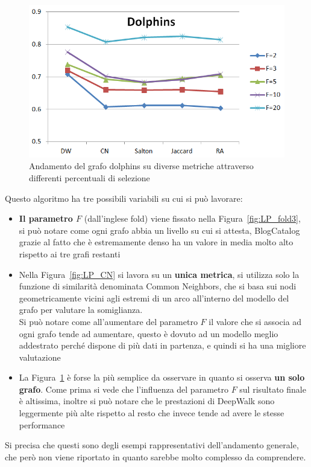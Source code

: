 %
\begin{figure}[htp]
	\centering
	\includegraphics[width=\linewidth]{immagini/LP_Dolphins}
	\caption{Andamento del grafo dolphins su diverse metriche attraverso differenti percentuali di selezione}
	\label{fig:LP_Dolphins}
\end{figure}
%
Questo algoritmo ha tre possibili variabili su cui si può lavorare:
\begin{itemize}
	\item \textbf{Il parametro $F$} (dall'inglese fold) viene fissato nella Figura~\ref{fig:LP_fold3}, si può notare come ogni grafo abbia un livello su cui si attesta, BlogCatalog grazie al fatto che è estremamente denso ha un valore in media molto alto rispetto ai tre grafi restanti
	\item Nella Figura~\ref{fig:LP_CN} si lavora su un \textbf{unica metrica}, si utilizza solo la funzione di similarità denominata Common Neighbors, che si basa sui nodi geometricamente vicini agli estremi di un arco all'interno del modello del grafo per valutare la somiglianza.\\
	Si può notare come all'aumentare del parametro $F$ il valore che si associa ad ogni grafo tende ad aumentare, questo è dovuto ad un modello meglio addestrato perché dispone di più dati in partenza, e quindi si ha una migliore valutazione
	\item La Figura~\ref{fig:LP_Dolphins} è forse la più semplice da osservare in quanto si osserva \textbf{un solo grafo}. Come prima si vede che l'influenza del parametro $F$ sul risultato finale è altissima, inoltre si può notare che le prestazioni di DeepWalk sono leggermente più alte rispetto al resto che invece tende ad avere le stesse performance 
\end{itemize}
Si precisa che questi sono degli esempi rappresentativi dell'andamento generale, che però non viene riportato in quanto sarebbe molto complesso da comprendere.
%
